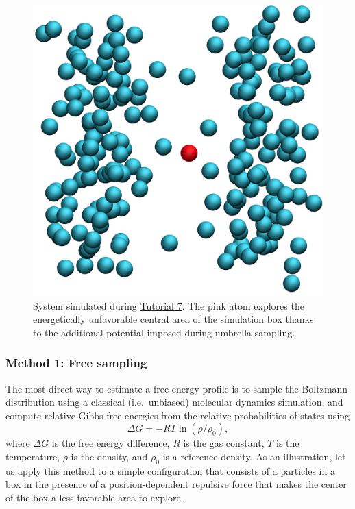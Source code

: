 \documentclass[9pt,tutorial]{livecoms}
\begin{document}
\begin{figure}
\centering
\includegraphics[width=0.7\linewidth]{US}
\caption{System simulated during \hyperref[umbrella-sampling-label]{Tutorial 7}.
The pink atom explores the energetically unfavorable central area of the simulation
box thanks to the additional potential imposed during umbrella sampling.}
\label{fig:US}
\end{figure}

\subsubsection{Method 1: Free sampling}
{\color{blue} The most direct way to estimate a free energy profile is to sample
the Boltzmann distribution using a classical (i.e.~unbiased) molecular dynamics
simulation, and compute relative Gibbs free energies from the relative probabilities
of states using}
\begin{equation}
\Delta G = -RT \ln(\rho/\rho_0),
\label{eq:G}
\end{equation}
where $\Delta G$ is the free energy difference, $R$ is the gas constant, $T$
is the temperature, %
{\color{blue}$\rho$ is the density, and $\rho_0$ is a reference density.}
As an illustration, let us apply this method to a simple configuration
that consists of a particles in a box in the presence of a
position-dependent repulsive force that makes the center of the box a less
favorable area to explore.
\end{document}
